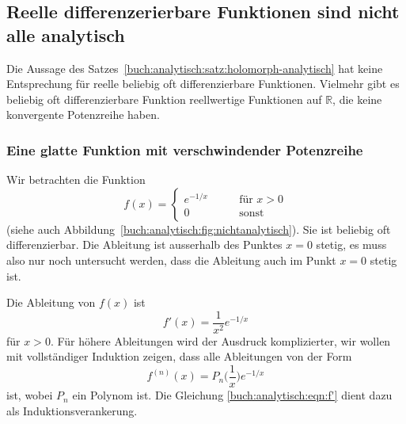 %
%
%
\subsection{Reelle differenzerierbare Funktionen sind nicht alle analytisch}
Die Aussage des Satzes~\ref{buch:analytisch:satz:holomorph-analytisch}
hat keine Entsprechung für reelle beliebig oft differenzierbare
Funktionen.
Vielmehr gibt es beliebig oft differenzierbare Funktion reellwertige
Funktionen auf $\mathbb{R}$, die keine konvergente Potenzreihe haben.

%
%
\subsubsection{Eine glatte Funktion mit verschwindender Potenzreihe}
%
Wir betrachten die Funktion
\begin{equation}
f(x)
=
\begin{cases}
e^{-1/x}&\qquad \text{für $x>0$}\\
0&\qquad\text{sonst}
\end{cases}
\label{buch:analytisch:fig:nichtanalytisch}
\end{equation}
(siehe auch Abbildung~\ref{buch:analytisch:fig:nichtanalytisch}).
Sie ist beliebig oft differenzierbar.
Die Ableitung ist ausserhalb des Punktes $x=0$ stetig, es muss also
nur noch untersucht werden, dass die Ableitung auch im Punkt $x=0$
stetig ist.

Die Ableitung von $f(x)$ ist
\begin{equation}
f'(x)
=
\frac{1}{x^2}
e^{-1/x}
\label{buch:analytisch:eqn:f'}
\end{equation}
für $x>0$.
Für höhere Ableitungen wird der Ausdruck komplizierter, wir wollen
mit vollständiger Induktion zeigen, dass alle Ableitungen von der Form
\begin{equation}
f^{(n)}(x)
=
P_n\biggl(\frac1x\biggr) e^{-1/x}
\label{buch:analytisch:eqn:fn=Pne}
\end{equation}
ist, wobei $P_n$ ein Polynom ist.
Die Gleichung \eqref{buch:analytisch:eqn:f'} dient dazu als
Induktionsverankerung.

